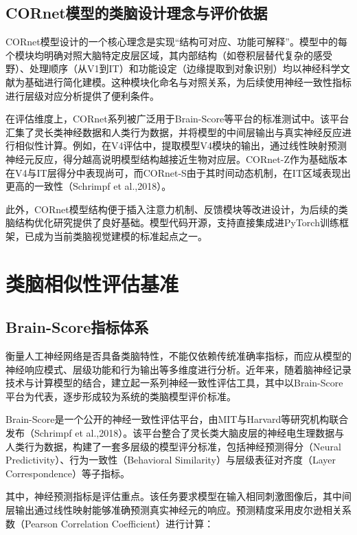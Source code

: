 \subsection{CORnet模型的类脑设计理念与评价依据}

CORnet模型设计的一个核心理念是实现“结构可对应、功能可解释”。模型中的每个模块均明确对照大脑特定皮层区域，其内部结构（如卷积层替代复杂的感受野）、处理顺序（从V1到IT）和功能设定（边缘提取到对象识别）均以神经科学文献为基础进行简化建模。这种模块化命名与对照关系，为后续使用神经一致性指标进行层级对应分析提供了便利条件。

在评估维度上，CORnet系列被广泛用于Brain-Score等平台的标准测试中。该平台汇集了灵长类神经数据和人类行为数据，并将模型的中间层输出与真实神经反应进行相似性计算。例如，在V4评估中，提取模型V4模块的输出，通过线性映射预测神经元反应，得分越高说明模型结构越接近生物对应层。CORnet-Z作为基础版本在V4与IT层得分中表现尚可，而CORnet-S由于其时间动态机制，在IT区域表现出更高的一致性（Schrimpf et al.,2018）。

此外，CORnet模型结构便于插入注意力机制、反馈模块等改进设计，为后续的类脑结构优化研究提供了良好基础。模型代码开源，支持直接集成进PyTorch训练框架，已成为当前类脑视觉建模的标准起点之一。

\section{类脑相似性评估基准}

\subsection{Brain-Score指标体系}

衡量人工神经网络是否具备类脑特性，不能仅依赖传统准确率指标，而应从模型的神经响应模式、层级功能和行为输出等多维度进行分析。近年来，随着脑神经记录技术与计算模型的结合，建立起一系列神经一致性评估工具，其中以Brain-Score平台为代表，逐步形成较为系统的类脑模型评价标准。

Brain-Score是一个公开的神经一致性评估平台，由MIT与Harvard等研究机构联合发布（Schrimpf et al.,2018）。该平台整合了灵长类大脑皮层的神经电生理数据与人类行为数据，构建了一套多层级的模型评分标准，包括神经预测得分（Neural Predictivity）、行为一致性（Behavioral Similarity）与层级表征对齐度（Layer Correspondence）等子指标。

其中，神经预测指标是评估重点。该任务要求模型在输入相同刺激图像后，其中间层输出通过线性映射能够准确预测真实神经元的响应。预测精度采用皮尔逊相关系数（Pearson Correlation Coefficient）进行计算：

